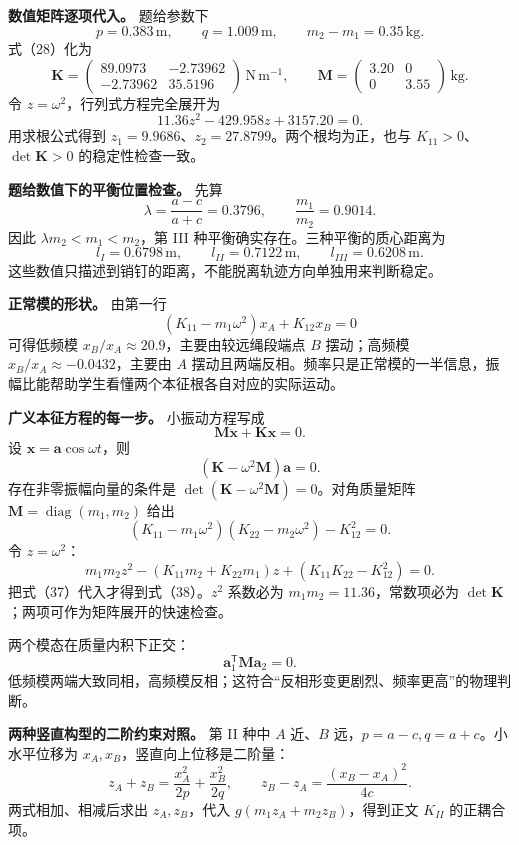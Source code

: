 \documentclass[12pt,a4paper,UTF8]{ctexart}
\begin{document}
\textbf{数值矩阵逐项代入。} 题给参数下 \[
p=0.383\,\mathrm m,
\qquad q=1.009\,\mathrm m,
\qquad m_2-m_1=0.35\,\mathrm{kg}. \tag{36}
\] 式（28）化为 \[
\mathbf K=
\begin{pmatrix}
89.0973&-2.73962\\
-2.73962&35.5196
\end{pmatrix}\,\mathrm{N\,m^{-1}},
\qquad
\mathbf M=
\begin{pmatrix}3.20&0\\0&3.55\end{pmatrix}\,\mathrm{kg}. \tag{37}
\] 令 \(z=\omega^2\)，行列式方程完全展开为 \[
11.36z^2-429.958z+3157.20=0. \tag{38}
\] 用求根公式得到 \(z_1=9.9686\)、\(z_2=27.8799\)。两个根均为正，也与
\(K_{11}>0\)、\(\det\mathbf K>0\) 的稳定性检查一致。

\textbf{题给数值下的平衡位置检查。} 先算 \[
\lambda=\frac{a-c}{a+c}=0.3796,
\qquad
\frac{m_1}{m_2}=0.9014. \tag{39}
\] 因此 \(\lambda m_2<m_1<m_2\)，第 III
种平衡确实存在。三种平衡的质心距离为 \[
l_I=0.6798\,\mathrm m,
\qquad
l_{II}=0.7122\,\mathrm m,
\qquad
l_{III}=0.6208\,\mathrm m. \tag{40}
\] 这些数值只描述到销钉的距离，不能脱离轨迹方向单独用来判断稳定。

\textbf{正常模的形状。} 由第一行 \[
(K_{11}-m_1\omega^2)x_A+K_{12}x_B=0 \tag{41}
\] 可得低频模 \(x_B/x_A\approx20.9\)，主要由较远绳段端点 \(B\)
摆动；高频模 \(x_B/x_A\approx-0.0432\)，主要由 \(A\)
摆动且两端反相。频率只是正常模的一半信息，振幅比能帮助学生看懂两个本征根各自对应的实际运动。

\textbf{广义本征方程的每一步。} 小振动方程写成 \[
\mathbf M\ddot{\boldsymbol x}
+\mathbf K\boldsymbol x=0.
\] 设 \(\boldsymbol x=\boldsymbol a\cos\omega t\)，则 \[
(\mathbf K-\omega^2\mathbf M)\boldsymbol a=0.
\] 存在非零振幅向量的条件是
\(\det(\mathbf K-\omega^2\mathbf M)=0\)。对角质量矩阵
\(\mathbf M=\operatorname{diag}(m_1,m_2)\) 给出 \[
(K_{11}-m_1\omega^2)(K_{22}-m_2\omega^2)-K_{12}^2=0.
\] 令 \(z=\omega^2\)： \[
m_1m_2z^2-
(K_{11}m_2+K_{22}m_1)z
+(K_{11}K_{22}-K_{12}^2)=0.
\] 把式（37）代入才得到式（38）。\(z^2\) 系数必为
\(m_1m_2=11.36\)，常数项必为
\(\det\mathbf K\)；两项可作为矩阵展开的快速检查。

两个模态在质量内积下正交： \[
\boldsymbol a_1^{\mathsf T}\mathbf M\boldsymbol a_2=0.
\]
低频模两端大致同相，高频模反相；这符合``反相形变更剧烈、频率更高''的物理判断。

\textbf{两种竖直构型的二阶约束对照。} 第 II 种中 \(A\) 近、\(B\)
远，\(p=a-c,q=a+c\)。小水平位移为 \(x_A,x_B\)，竖直向上位移是二阶量： \[
z_A+z_B=\frac{x_A^2}{2p}+\frac{x_B^2}{2q},
\qquad
z_B-z_A=\frac{(x_B-x_A)^2}{4c}.
\] 两式相加、相减后求出 \(z_A,z_B\)，代入 \(g(m_1z_A+m_2z_B)\)，得到正文
\(K_{II}\) 的正耦合项。
\end{document}
